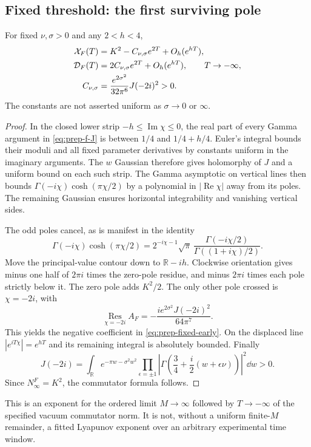 \subsection{Fixed threshold: the first surviving pole}
\begin{theorem}
For fixed $\nu,\sigma>0$ and any $2<h<4$,
\begin{align}
 \mathcal X_F(T)&=K^2-C_{\nu,\sigma}e^{2T}+O_h(e^{hT}),\notag\\
 \mathcal D_F(T)&=2C_{\nu,\sigma}e^{2T}+O_h(e^{hT}),
 \qquad T\to-\infty,\notag\\
 C_{\nu,\sigma}&=\frac{e^{2\sigma^2}}{32\pi^6}J(-2i)^2>0.
 \label{eq:prep-fixed-early}
\end{align}
The constants are not asserted uniform as $\sigma\to0$ or $\infty$.
\label{thm:prep-fixed}
\end{theorem}
\begin{proof}
In the closed lower strip $-h\le\operatorname{Im}\chi\le0$, the real
part of every Gamma argument in \eqref{eq:prep-f-J} is between $1/4$
and $1/4+h/4$. Euler's integral bounds their moduli and all fixed
parameter derivatives by constants uniform in the imaginary arguments.
The $w$ Gaussian therefore gives holomorphy of $J$ and a uniform bound
on each such strip. The Gamma asymptotic on vertical lines then bounds
\(\Gamma(-i\chi)\cosh(\pi\chi/2)\) by a polynomial in
$|\operatorname{Re}\chi|$ away from its poles. The remaining Gaussian
ensures horizontal integrability and vanishing vertical sides.

The odd poles cancel, as is manifest in the identity
\begin{equation}
 \Gamma(-i\chi)\cosh(\pi\chi/2)
  =2^{-i\chi-1}\sqrt\pi\,
       \frac{\Gamma(-i\chi/2)}{\Gamma((1+i\chi)/2)}.
 \label{eq:prep-even-poles}
\end{equation}
Move the principal-value contour down to $\mathbb R-ih$. Clockwise
orientation gives minus one half of $2\pi i$ times the zero-pole
residue, and minus $2\pi i$ times each pole strictly below it. The zero
pole adds $K^2/2$. The only other pole crossed is $\chi=-2i$, with
\[
 \operatorname*{Res}_{\chi=-2i}A_F
   =-\frac{i e^{2\sigma^2}J(-2i)^2}{64\pi^7}.
\]
This yields the negative coefficient in \eqref{eq:prep-fixed-early}.
On the displaced line $|e^{iT\chi}|=e^{hT}$ and its remaining integral
is absolutely bounded. Finally
\[
 J(-2i)=\int_{\mathbb R}e^{-\pi w-\sigma^2w^2}
       \prod_{\epsilon=\pm1}
       \left|\Gamma\left(\frac34+\frac i2(w+\epsilon\nu)\right)\right|^2
       \dd w>0.
\]
Since $N^F_\infty=K^2$, the commutator formula follows.
\end{proof}
This is an exponent for the ordered limit $M\to\infty$ followed by
$T\to-\infty$ of the specified vacuum commutator norm. It is not,
without a uniform finite-$M$ remainder, a fitted Lyapunov exponent over
an arbitrary experimental time window.

